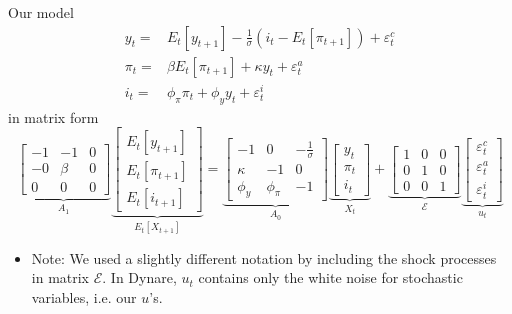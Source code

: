 \begin{frame}{Our model}
\begin{align*}
y_t 	=& E_t \left[y_{t+1} \right]- \frac{1}{\sigma}\left(i_t-E_t\left[\pi_{t+1}\right]\right)+\varepsilon_t^c \\
\pi_t 	=& \beta E_t\left[\pi_{t+1}\right]+\kappa y_t +\varepsilon_t^a \\
i_t 	=& \phi_\pi \pi_t + \phi_y y_t + \varepsilon_t^i
\end{align*}
in matrix form
\begin{equation*}
\underbrace{
\begin{bmatrix}
-1 & -1 & 0\\
-0 & \beta & 0 \\
0 & 0 & 0
\end{bmatrix}}_{A_1}
\underbrace{
\begin{bmatrix}
E_t\left[y_{t+1} \right]\\
E_t\left[\pi_{t+1} \right]\\
E_t\left[i_{t+1} \right]
\end{bmatrix}}
_{E_t[X_{t+1}]}
=
\underbrace{
\begin{bmatrix}
-1 & 0 & -\frac{1}{\sigma}\\
\kappa & -1 & 0 \\
\phi_y&\phi_\pi & -1
\end{bmatrix}}_{A_0}
\underbrace{
\begin{bmatrix}
y_{t}\\
\pi_{t}\\
i_{t}
\end{bmatrix}}_{X_t}
+\underbrace{
\begin{bmatrix}
1 & 0 & 0\\
0 & 1 & 0\\
0 & 0 & 1
\end{bmatrix}}_{\mathcal{E}}
\underbrace{
\begin{bmatrix}
\varepsilon^c_{t}\\
\varepsilon^a_{t}\\
\varepsilon^i_{t}
\end{bmatrix}}_{u_t}
\end{equation*}
\begin{itemize}
    \item Note: We used a slightly different notation by including the shock processes in matrix $\mathcal{E}$. In Dynare, $u_t$ contains only the white noise for stochastic variables, i.e. our $u$'s.
\end{itemize}
\end{frame}

